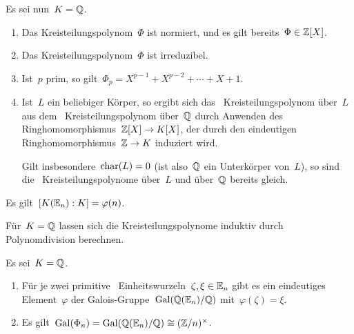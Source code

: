 \begin{proposition}
  Es sei nun~$K = \mathbb{Q}$.
  \begin{enumerate}
    \item
      Das Kreisteilungspolynom~$\Phi$ ist normiert, und es gilt bereits~$\Phi \in \mathbb{Z}[X]$.
    \item
      Das Kreisteilungspolynom~$\Phi$ ist irreduzibel.
    \item
      Ist~$p$ prim, so gilt~$\Phi_p = X^{p-1} + X^{p-2} + \dotsb + X + 1$.
    \item
      Ist~$L$ ein beliebiger Körper, so ergibt sich das~ Kreisteilungspolynom über~$L$ aus dem~ Kreisteilungspolynom über~$\mathbb{Q}$ durch Anwenden des Ringhomomorphismus~$\Integer[X] \to K[X]$, der durch den eindeutigen Ringhomomorphismus~$\Integer \to K$ induziert wird.

      Gilt insbesondere~$\operatorname{char}(L) = 0$ (ist also~$\mathbb{Q}$ ein Unterkörper von~$L$), so sind die~ Kreisteilungspolynome über~$L$ und über~$\mathbb{Q}$ bereits gleich.
  \end{enumerate}
\end{proposition}

\begin{corollary}
  Es gilt~$[K(\operatorname{\mathbb{E}}_n) : K] = \varphi(n)$.
\end{corollary}

\begin{remark}
  Für~$K = \mathbb{Q}$ lassen sich die Kreisteilungspolynome induktiv durch Polynomdivision berechnen.
\end{remark}

\begin{corollary}
  Es sei~$K = \mathbb{Q}$.
  \begin{enumerate}
    \item
      Für je zwei primitive~ Einheitswurzeln~$\zeta, \xi \in \operatorname{\mathbb{E}}_n$ gibt es ein eindeutiges Element~$\varphi$ der Galois-Gruppe~$\operatorname{Gal}( \mathbb{Q}(\operatorname{\mathbb{E}}_n) / \mathbb{Q} )$ mit~$\varphi(\zeta) = \xi$.
    \item
      Es gilt~$\operatorname{Gal}( \Phi_n ) = \operatorname{Gal}( \mathbb{Q}(\operatorname{\mathbb{E}}_n) / \mathbb{Q} ) \cong (\mathbb{Z}/n)^\times$.
  \end{enumerate}
\end{corollary}




